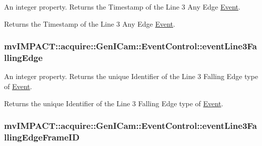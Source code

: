 An integer property. Returns the Timestamp of the Line 3 Any Edge \hyperlink{classmv_i_m_p_a_c_t_1_1acquire_1_1_event}{Event}. 

Returns the Timestamp of the Line 3 Any Edge \hyperlink{classmv_i_m_p_a_c_t_1_1acquire_1_1_event}{Event}. \hypertarget{classmv_i_m_p_a_c_t_1_1acquire_1_1_gen_i_cam_1_1_event_control_af9395b2b3d1bb500ecbe2eb8a732a5e1}{
\subsubsection[{event\+Line3\+Falling\+Edge}]{ mv\+I\+M\+P\+A\+C\+T\+::acquire\+::\+Gen\+I\+Cam\+::\+Event\+Control\+::event\+Line3\+Falling\+Edge}}\label{classmv_i_m_p_a_c_t_1_1acquire_1_1_gen_i_cam_1_1_event_control_af9395b2b3d1bb500ecbe2eb8a732a5e1}


An integer property. Returns the unique Identifier of the Line 3 Falling Edge type of \hyperlink{classmv_i_m_p_a_c_t_1_1acquire_1_1_event}{Event}. 

Returns the unique Identifier of the Line 3 Falling Edge type of \hyperlink{classmv_i_m_p_a_c_t_1_1acquire_1_1_event}{Event}. \hypertarget{classmv_i_m_p_a_c_t_1_1acquire_1_1_gen_i_cam_1_1_event_control_a2b4ff20a9a766faaa3ccdbfc29eef6d0}{
\subsubsection[{event\+Line3\+Falling\+Edge\+Frame\+I\+D}]{ mv\+I\+M\+P\+A\+C\+T\+::acquire\+::\+Gen\+I\+Cam\+::\+Event\+Control\+::event\+Line3\+Falling\+Edge\+Frame\+I\+D}}\label{classmv_i_m_p_a_c_t_1_1acquire_1_1_gen_i_cam_1_1_event_control_a2b4ff20a9a766faaa3ccdbfc29eef6d0}


